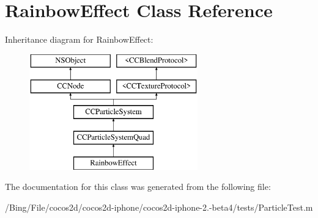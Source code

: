 \hypertarget{interface_rainbow_effect}{\section{Rainbow\-Effect Class Reference}
\label{interface_rainbow_effect}
}
Inheritance diagram for Rainbow\-Effect\-:\begin{figure}[H]
\begin{center}
\leavevmode
\includegraphics[height=5.000000cm]{interface_rainbow_effect}
\end{center}
\end{figure}


The documentation for this class was generated from the following file\-:\begin{DoxyCompactItemize}
\item 
/\-Bing/\-File/cocos2d/cocos2d-\/iphone/cocos2d-\/iphone-\/2.-\/beta4/tests/Particle\-Test.\-m\end{DoxyCompactItemize}
